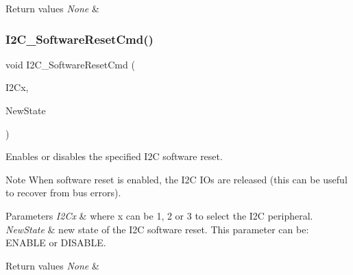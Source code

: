\begin{DoxyRetVals}{Return values}
{\em None} & \\
\hline
\end{DoxyRetVals}
\mbox{\label{group___i2_c___group1_ga1289c908aeb882443aba323b459c638b}} 
\subsubsection{\texorpdfstring{I2\+C\+\_\+\+Software\+Reset\+Cmd()}{I2C\_SoftwareResetCmd()}}
{\footnotesize\ttfamily void I2\+C\+\_\+\+Software\+Reset\+Cmd (\begin{DoxyParamCaption}\item[{I2\+C\+\_\+\+Type\+Def $\ast$}]{I2\+Cx,  }\item[{Functional\+State}]{New\+State }\end{DoxyParamCaption})}



Enables or disables the specified I2C software reset. 

\begin{DoxyNote}{Note}
When software reset is enabled, the I2C I\+Os are released (this can be useful to recover from bus errors). ~\newline

\end{DoxyNote}

\begin{DoxyParams}{Parameters}
{\em I2\+Cx} & where x can be 1, 2 or 3 to select the I2C peripheral. \\
\hline
{\em New\+State} & new state of the I2C software reset. This parameter can be\+: E\+N\+A\+B\+LE or D\+I\+S\+A\+B\+LE. \\
\hline
\end{DoxyParams}

\begin{DoxyRetVals}{Return values}
{\em None} & \\
\hline
\end{DoxyRetVals}
\mbox{\label{group___i2_c___group1_ga7459feb3b1dfcd3e4f6574002ca7d3bd}} 
